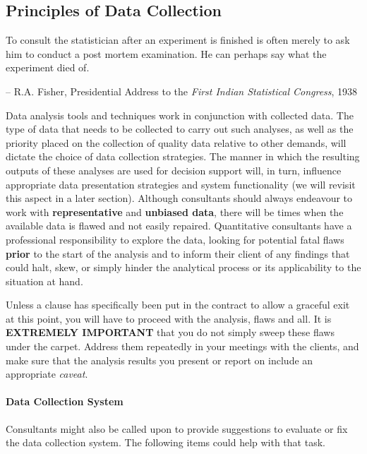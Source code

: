 \subsection{Principles of Data Collection} \label{sec:DC}
\begin{tcolorbox}[title=Fisher's Maxim]
To consult the statistician after an experiment is finished is often merely to ask him to conduct a post mortem examination. He can perhaps say what the experiment died of. \\[-0.6cm]
\begin{flushright}
-- R.A. Fisher, Presidential Address to the \textit{First Indian Statistical Congress}, 1938
\end{flushright}
\end{tcolorbox}
\noindent Data analysis tools and techniques work in conjunction with collected data. The type of data that needs to be collected to carry out such analyses, as well as the priority placed on the collection of quality data relative to other demands, will dictate the choice of data collection strategies. The manner in which the resulting outputs of these analyses are used for decision support will, in turn, influence appropriate data presentation strategies and system functionality (we will revisit this aspect in a later section).  
\newl Although consultants should always endeavour to work with \textbf{representative} and \textbf{unbiased data}, there will be times when the available data is flawed and not easily repaired. Quantitative consultants have a professional responsibility to explore the data, looking for potential fatal flaws \textbf{prior} to  the start of the analysis and to inform their client of any findings that could halt, skew, or simply hinder the analytical process or its applicability to the situation at hand. 
\par Unless a clause has specifically been put in the contract to allow a graceful exit at this point, you will have to proceed with the analysis, flaws and all. It is  \textbf{EXTREMELY IMPORTANT} that you do not simply sweep these flaws under the carpet. Address them repeatedly in your meetings with the clients, and make sure that  the analysis results you present or report on include an appropriate \textit{caveat}. \paragraph{Data Collection System} Consultants might also be called upon to provide suggestions to evaluate or fix the data collection system. The following items could help with that task. 
